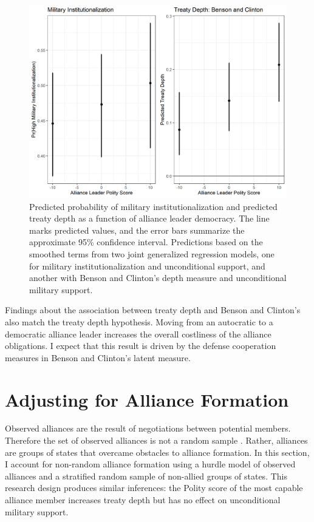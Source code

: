 \documentclass[12pt]{article}
\begin{document}
\begin{figure}
\includegraphics[width=.95\textwidth]{results-alt-measures.png}  
\caption{Predicted probability of military institutionalization and predicted treaty depth as a function of alliance leader democracy. The line marks predicted values, and the error bars summarize the approximate 95\% confidence interval. Predictions based on the smoothed terms from two joint generalized regression models, one for military institutionalization and unconditional support, and another with Benson and Clinton's depth measure and unconditional military support. }
\label{fig:results-alt-measures}
\end{figure}

Findings about the association between treaty depth and Benson and Clinton's also match the treaty depth hypothesis. 
Moving from an autocratic to a democratic alliance leader increases the overall costliness of the alliance obligations. 
I expect that this result is driven by the defense cooperation measures in Benson and Clinton's latent measure. 



\section{Adjusting for Alliance Formation}


Observed alliances are the result of negotiations between potential members. 
Therefore the set of observed alliances is not a random sample \citep{Poast2019a}.
Rather, alliances are groups of states that overcame obstacles to alliance formation.  
In this section, I account for non-random alliance formation using a hurdle model of observed alliances and a stratified random sample of non-allied groups of states. 
This research design produces similar inferences: the Polity score of the most capable alliance member increases treaty depth but has no effect on unconditional military support. 
\end{document}
